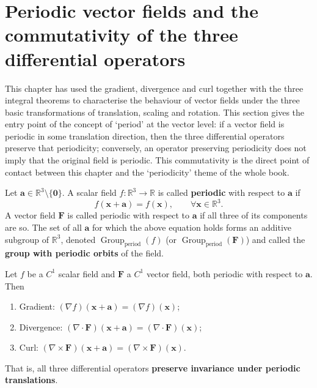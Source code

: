 \section{Periodic vector fields and the commutativity of the three differential operators}
\label{sec:periodic_vector_fields}

This chapter has used the gradient, divergence and curl together with the three integral theorems to characterise the behaviour of vector fields under the three basic transformations of translation, scaling and rotation. This section gives the entry point of the concept of `period' at the vector level: if a vector field is periodic in some translation direction, then the three differential operators preserve that periodicity; conversely, an operator preserving periodicity does not imply that the original field is periodic. This commutativity is the direct point of contact between this chapter and the `periodicity' theme of the whole book.

\begin{definition}\label{def:periodic_vector_field}
Let $\mathbf a\in\mathbb R^3\setminus\{\mathbf 0\}$. A scalar field $f:\mathbb R^3\to\mathbb R$ is called \textbf{periodic} with respect to $\mathbf a$ if
\[
f(\mathbf x+\mathbf a)=f(\mathbf x),\qquad \forall \mathbf x\in\mathbb R^3 .
\]
A vector field $\mathbf F$ is called periodic with respect to $\mathbf a$ if all three of its components are so. The set of all $\mathbf a$ for which the above equation holds forms an additive subgroup of $\mathbb R^3$, denoted $\operatorname{Group}_{\mathrm{period}}(f)$ (or $\operatorname{Group}_{\mathrm{period}}(\mathbf F)$) and called the \textbf{group with periodic orbits} of the field.
\end{definition}

\begin{proposition}\label{prop:operators_commute_period}
Let $f$ be a $C^1$ scalar field and $\mathbf F$ a $C^1$ vector field, both periodic with respect to $\mathbf a$. Then
\begin{enumerate}[label=(\roman*)]
    \item Gradient: $(\nabla f)(\mathbf x+\mathbf a)=(\nabla f)(\mathbf x)$;
    \item Divergence: $(\nabla\cdot\mathbf F)(\mathbf x+\mathbf a)=(\nabla\cdot\mathbf F)(\mathbf x)$;
    \item Curl: $(\nabla\times\mathbf F)(\mathbf x+\mathbf a)=(\nabla\times\mathbf F)(\mathbf x)$.
\end{enumerate}
That is, all three differential operators \textbf{preserve invariance under periodic translations}.
\end{proposition}

